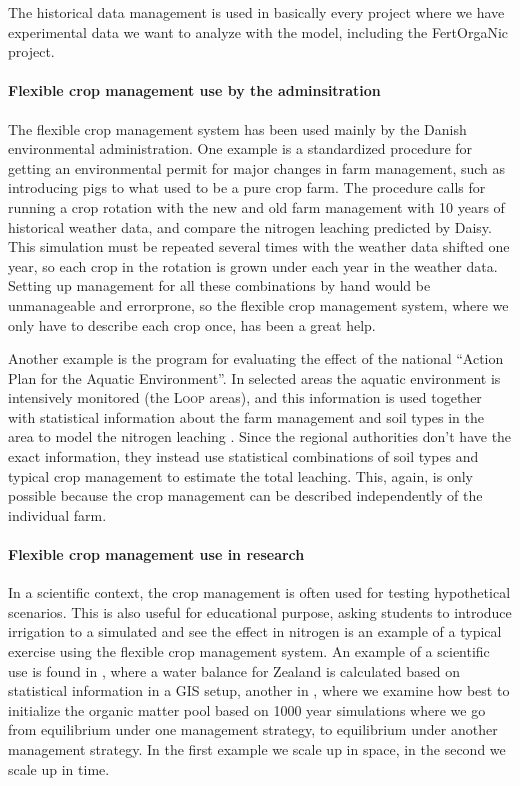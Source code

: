 \documentclass[a4paper]{article}
\begin{document}
The historical data management is used in basically every project
where we have experimental data we want to analyze with the model,
including the FertOrgaNic project.

\paragraph{Flexible crop management use by the adminsitration} The
flexible crop management system has been used mainly by the Danish
environmental administration.  One example is a standardized procedure
\cite{daisy-staabi} for getting an environmental permit for major
changes in farm management, such as introducing pigs to what used to
be a pure crop farm.  The procedure calls for running a crop rotation
with the new and old farm management with 10 years of historical
weather data, and compare the nitrogen leaching predicted by Daisy.
This simulation must be repeated several times with the weather data
shifted one year, so each crop in the rotation is grown under each
year in the weather data.  Setting up management for all these
combinations by hand would be unmanageable and errorprone, so the
flexible crop management system, where we only have to describe each
crop once, has been a great help.

Another example is the program for evaluating the effect of the
national ``Action Plan for the Aquatic Environment''.  In selected
areas the aquatic environment is intensively monitored (the
\textsc{Loop} areas), and this information is used together with
statistical information about the farm management and soil types in
the area to model the nitrogen leaching \cite{novana}.  Since the
regional authorities don't have the exact information, they instead
use statistical combinations of soil types and typical crop management
to estimate the total leaching.  This, again, is only possible because
the crop management can be described independently of the individual
farm.

\paragraph{Flexible crop management use in research} In a scientific
context, the crop management is often used for testing hypothetical
scenarios.  This is also useful for educational purpose, asking
students to introduce irrigation to a simulated and see the effect in
nitrogen is an example of a typical exercise using the flexible crop
management system.  An example of a scientific use is found in
\cite{boegh04a}, where a water balance for Zealand is calculated based
on statistical information in a GIS setup, another in \cite{org-init},
where we examine how best to initialize the organic matter pool based
on 1000 year simulations where we go from equilibrium under one
management strategy, to equilibrium under another management strategy.
In the first example we scale up in space, in the second we scale up
in time.
\end{document}
